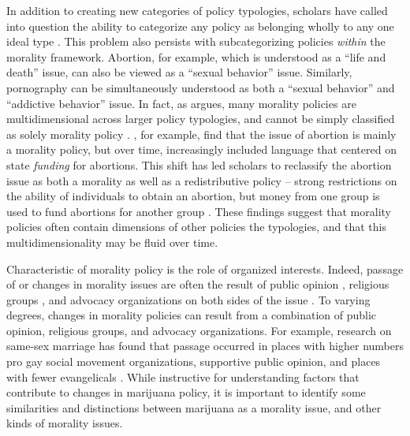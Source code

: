 In addition to creating new categories of policy typologies, scholars have called into question the ability to categorize any policy as belonging wholly to any one ideal type \citep{greenberg_et_al_1977,roh_and_berry_2008,spitzer_1987,steinberger_1980}. This problem also persists with subcategorizing policies \textit{within} the morality framework. Abortion, for example, which is understood as a ``life and death'' issue, can also be viewed as a ``sexual behavior'' issue. Similarly, pornography can be simultaneously understood as both a ``sexual behavior'' and ``addictive behavior'' issue. In fact, as \citet{meier_2001} argues, many morality policies are multidimensional across larger policy typologies, and cannot be simply classified as solely morality policy \citep{meier_2001,spitzer_1995}. \citet{roh_and_berry_2008}, for example, find that the issue of abortion is mainly a morality policy, but over time, increasingly included language that  centered on state \textit{funding} for abortions. This shift has led scholars to reclassify the abortion issue as both a morality as well as a redistributive policy -- strong restrictions on the ability of individuals to obtain an abortion, but money from one group is used to fund abortions for another group \citep{roh_and_berry_2008,meier_and_mcfarlane_1993}. These findings suggest that morality policies often contain dimensions of other policies the \citet{lowi_1964} typologies, and that this multidimensionality may be fluid over time.

Characteristic of morality policy is the role of organized interests. Indeed, passage of or changes in morality issues are often the result of public opinion \citep{geer_1996}, religious groups \citep{morgan_and_meier_1980,fairbanks_1977}, and advocacy organizations on both sides of the issue \citep{haider_markel_and_meier_1996,mooney_1999,roh_and_berry_2008}. To varying degrees, changes in morality policies can result from a combination of public opinion, religious groups, and advocacy organizations. For example, research on same-sex marriage has found that passage occurred in places with higher numbers pro gay social movement organizations, supportive public opinion, and places with fewer evangelicals \citep{baunach_2012,soule_2004}. While instructive for understanding factors that contribute to changes in marijuana policy, it is important to identify some similarities and distinctions between marijuana as a morality issue, and other kinds of morality issues. 


